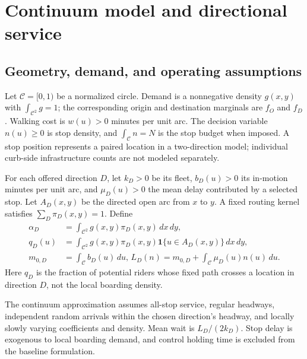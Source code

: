\documentclass[11pt]{article}
\theoremstyle{remark}\newtheorem{remark}[theorem]{Remark}
\newcommand{\C}{\mathcal C}
\newcommand{\ind}{\mathbf 1}
\begin{document}
\section{Continuum model and directional service}\label{sec:model}
\subsection{Geometry, demand, and operating assumptions}
Let $\C=[0,1)$ be a normalized circle. Demand is a nonnegative density $g(x,y)$ with $\int_{\C^2}g=1$; the corresponding origin and destination marginals are $f_O$ and $f_D$. Walking cost is $w(u)>0$ minutes per unit arc. The decision variable $n(u)\geq0$ is stop density, and $\int_\C n=N$ is the stop budget when imposed. A stop position represents a paired location in a two-direction model; individual curb-side infrastructure counts are not modeled separately.

For each offered direction $D$, let $k_D>0$ be its fleet, $b_D(u)>0$ its in-motion minutes per unit arc, and $\mu_D(u)>0$ the mean delay contributed by a selected stop. Let $A_D(x,y)$ be the directed open arc from $x$ to $y$. A fixed routing kernel satisfies $\sum_D\pi_D(x,y)=1$. Define
\begin{align}
\alpha_D&=\int_{\C^2}g(x,y)\pi_D(x,y)\,dx\,dy,\\
q_D(u)&=\int_{\C^2}g(x,y)\pi_D(x,y)\ind\{u\in A_D(x,y)\}\,dx\,dy,\label{eq:q}\\
m_{0,D}&=\int_\C b_D(u)\,du,\,
L_D(n)=m_{0,D}+\int_\C\mu_D(u)n(u)\,du.
\end{align}
Here $q_D$ is the fraction of potential riders whose fixed path crosses a location in direction $D$, not the local boarding density.

The continuum approximation assumes all-stop service, regular headways, independent random arrivals within the chosen direction's headway, and locally slowly varying coefficients and density. Mean wait is $L_D/(2k_D)$. Stop delay is exogenous to local boarding demand, and control holding time is excluded from the baseline formulation.
\end{document}
